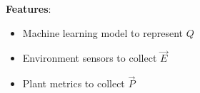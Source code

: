 \documentclass{report}
\begin{document}
\textbf{Features}:
\begin{itemize}
    \item Machine learning model to represent $Q$
    \item Environment sensors to collect $\vec E$
    \item Plant metrics to collect $\vec P$
\end{itemize}

\newpage









\end{document}
